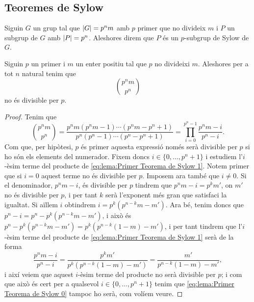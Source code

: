 \documentclass[../../Main.tex]{subfiles}
\begin{document}
	\subsection{Teoremes de Sylow}
	\begin{definition}
		\label{def:p-subgrup de Sylow}
		Siguin \(G\) un grup tal que \(\abs{G}=p^{n}m\) amb \(p\) primer que no divideix \(m\) i \(P\) un subgrup de \(G\) amb \(\abs{P}=p^{n}\). Aleshores direm que \(P\) és un \(p\)-subgrup de Sylow de \(G\).
	\end{definition}
	\begin{lemma}
		\label{lema:Primer Teorema de Sylow}
		Siguin \(p\) un primer i \(m\) un enter positiu tal que \(p\) no divideixi \(m\). Aleshores per a tot \(n\) natural tenim que
		\begin{equation}
			\label{eq:lema:Primer Teorema de Sylow 0}
			\binom{p^{n}m}{p^{n}}
		\end{equation}
		no és divisible per \(p\).
		\begin{proof}
			Tenim que
			\begin{equation}
				\label{eq:lema:Primer Teorema de Sylow 1}
				\binom{p^{n}m}{p^{n}}
				=\frac{p^{n}m(p^{n}m-1)\cdots(p^{n}m-p^{n}+1)}{p^{n}(p^{n}-1)\cdots(p^{n}-p^{n}+1)}=\prod_{i=0}^{p^{n}-1}\frac{p^{n}m-i}{p^{n}-i}.
			\end{equation}
			Com que, per hipòtesi, \(p\) és primer aquesta expressió només serà divisible per \(p\) si ho són els elements del numerador. Fixem doncs \(i\in\{0,\dots,p^{n}+1\}\) i estudiem l'\(i\)-èsim terme del producte de \eqref{eq:lema:Primer Teorema de Sylow 1}. Notem primer que si \(i=0\) aquest terme no és divisible per \(p\). Imposem ara també que \(i\neq0\). Si el denominador, \(p^{n}m-i\), és divisible per \(p\) tindrem que \(p^{n}m-i=p^{k}m'\), on \(m'\) no és divisible per \(p\), i per tant \(k\) serà l'exponent més gran que satisfaci la igualtat. Si aïllem \(i\) obtindrem \(i=p^{k}(p^{n-k}m-m')\). Ara bé, tenim doncs que \(p^{n}-i=p^{n}-p^{k}(p^{n-k}m-m')\), i això és \(p^{n}-p^{k}(p^{n-k}m-m')=p^{k}(p^{n-k}(1-m)-m')\), i per tant tindrem que l'\(i\)-èsim terme del producte de \eqref{eq:lema:Primer Teorema de Sylow 1} serà de la forma
			\[\frac{p^{n}m-i}{p^{n}-i}=\frac{p^{k}m'}{p^{k}(p^{n-k}(1-m)-m')}=\frac{m'}{p^{n-k}(1-m)-m'},\]
			i així veiem que aquest \(i\)-èsim terme del producte no serà divisible per \(p\); i com que això és cert per a qualsevol \(i\in\{0,\dots,p^{n}+1\}\) tenim que \eqref{eq:lema:Primer Teorema de Sylow 0} tampoc ho serà, com volíem veure.
		\end{proof}
	\end{lemma}
\end{document}
